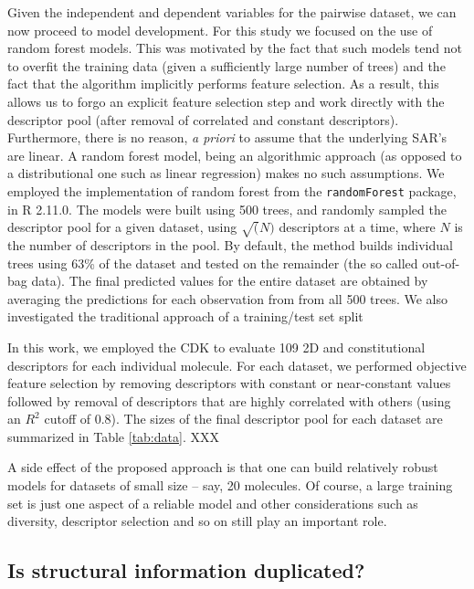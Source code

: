 \documentclass[letterpaper, 12pt]{article}
\begin{document}
Given the independent and dependent variables for the pairwise dataset, we can now proceed to model
development. For this study we focused on the use of random forest models\cite{Breiman:1984aa}. This
was motivated by the fact that such models tend not to overfit the training data (given a
sufficiently large number of trees) and the fact that the algorithm implicitly performs feature
selection. As a result, this allows us to forgo an explicit feature selection step and work directly
with the descriptor pool (after removal of correlated and constant descriptors). Furthermore, there
is no reason, \emph{a priori} to assume that the underlying SAR's are linear. A random forest model,
being an algorithmic approach\cite{Breiman:2001nx} (as opposed to a distributional one such as
linear regression) makes no such assumptions. We employed the implementation of random forest from
the \texttt{randomForest} package, in R 2.11.0\cite{r}. The models were built using 500 trees, and
randomly sampled the descriptor pool for a given dataset, using $\sqrt(N)$ descriptors at a time,
where $N$ is the number of descriptors in the pool. By default, the method builds individual trees
using 63\% of the dataset and tested on the remainder (the so called out-of-bag data). The final
predicted values for the entire dataset are obtained by averaging the predictions for each
observation from from all 500 trees. We also investigated the traditional approach of a
training/test set split

In this work, we employed the CDK to evaluate 109 2D and constitutional descriptors for each
individual molecule. For each dataset, we performed objective feature selection by removing
descriptors with constant or near-constant values followed by removal of descriptors that are highly
correlated with others (using an $R^2$ cutoff of 0.8). The sizes of the final descriptor pool for
each dataset are summarized in Table \ref{tab:data}. XXX

A side effect of the proposed approach is that one can build relatively robust models for datasets of
small size -- say, 20 molecules. Of course, a large training set is just one aspect of a reliable
model and other considerations such as diversity, descriptor selection and so on still play an
important role.

\subsection{Is structural information duplicated?}
\label{sec:are-we-duplicating}
\end{document}
